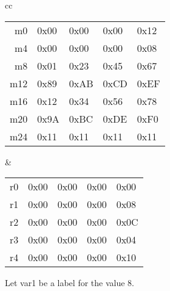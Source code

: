 \begin{tabular}{cc}
\begin{tabular}{r|l|l|l|l|} \cline{2-5}
  m0  & 0x00 & 0x00 & 0x00 & 0x12 \\ \cline{2-5}
  m4  & 0x00 & 0x00 & 0x00 & 0x08 \\ \cline{2-5}
  m8  & 0x01 & 0x23 & 0x45 & 0x67 \\ \cline{2-5}
  m12 & 0x89 & 0xAB & 0xCD & 0xEF \\ \cline{2-5}
  m16 & 0x12 & 0x34 & 0x56 & 0x78 \\ \cline{2-5}
  m20 & 0x9A & 0xBC & 0xDE & 0xF0 \\ \cline{2-5}
  m24 & 0x11 & 0x11 & 0x11 & 0x11 \\ \cline{2-5}
\end{tabular}

&

\begin{tabular}{r|l|l|l|l|} \cline{2-5}
  r0  & 0x00 & 0x00 & 0x00 & 0x00 \\ \cline{2-5}
  r1  & 0x00 & 0x00 & 0x00 & 0x08 \\ \cline{2-5}
  r2  & 0x00 & 0x00 & 0x00 & 0x0C \\ \cline{2-5}
  r3  & 0x00 & 0x00 & 0x00 & 0x04 \\ \cline{2-5}
  r4  & 0x00 & 0x00 & 0x00 & 0x10 \\ \cline{2-5}
\end{tabular}
\end{tabular}
\vspace{.1in}

Let var1 be a label for the value 8.

